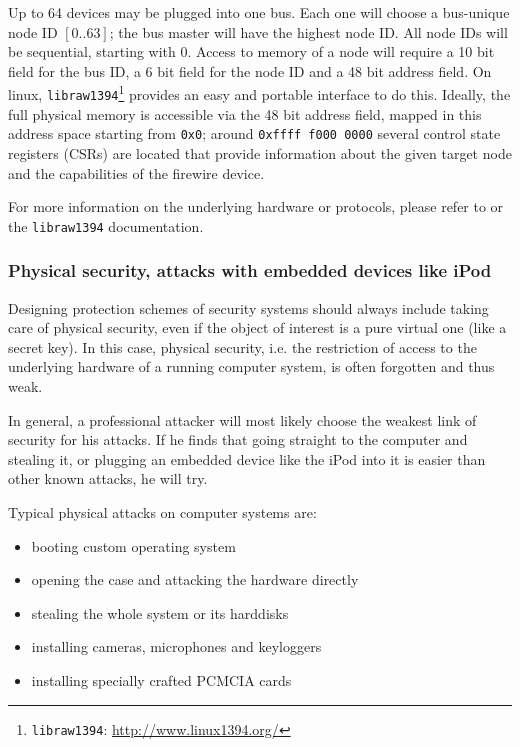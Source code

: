 Up to 64 devices may be plugged into one bus. Each one will choose a bus-unique
node ID $[0..63]$; the bus master will have the highest node ID. All node IDs
will be sequential, starting with 0. Access to memory of a node will require a
10 bit field for the bus ID, a 6 bit field for the node ID and a 48 bit address
field.  On linux, \texttt{libraw1394}\footnote{\texttt{libraw1394}:
\href{http://www.linux1394.org/}{http://www.linux1394.org/}} provides an easy
and portable interface to do this. Ideally, the full physical memory is
accessible via the 48 bit address field, mapped in this address space starting
from \texttt{0x0}; around \texttt{0xffff~f000~0000} several control state
registers (CSRs) are located that provide information about the given target
node and the capabilities of the firewire device.

For more information on the underlying hardware or protocols, please refer to
\cite{OHCIspecs:2000,fwire_sys_arch:2222} or the \texttt{libraw1394}
documentation.



\subsubsection{Physical security, attacks with embedded devices like iPod}

Designing protection schemes of security systems should always include taking
care of physical security, even if the object of interest is a pure virtual one
(like a secret key). In this case, physical security, i.e. the restriction of
access to the underlying hardware of a running computer system, is often
forgotten and thus weak.

In general, a professional attacker will most likely choose the weakest link of
security for his attacks. If he finds that going straight to the computer and
stealing it, or plugging an embedded device like the iPod into it is easier than
other known attacks, he will try.

Typical physical attacks on computer systems are:

\begin{itemize}

	\item booting custom operating system

	\item opening the case and attacking the hardware directly

	\item stealing the whole system or its harddisks

	\item installing cameras, microphones and keyloggers

	\item installing specially crafted PCMCIA cards

\end{itemize}

